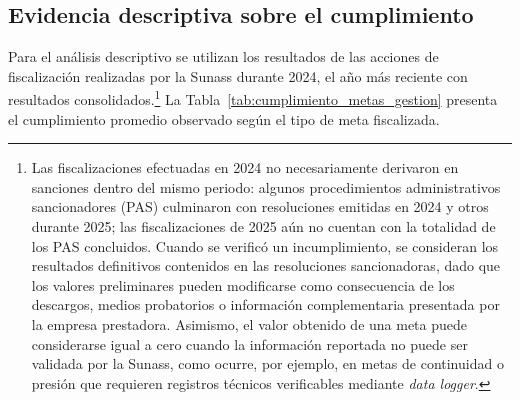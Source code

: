 \subsection{Evidencia descriptiva sobre el cumplimiento}

Para el análisis descriptivo se utilizan los resultados de las acciones de fiscalización realizadas por la Sunass durante 2024, el año más reciente con resultados consolidados.\footnote{Las fiscalizaciones efectuadas en 2024 no necesariamente derivaron en sanciones dentro del mismo periodo: algunos procedimientos administrativos sancionadores (PAS) culminaron con resoluciones emitidas en 2024 y otros durante 2025; las fiscalizaciones de 2025 aún no cuentan con la totalidad de los PAS concluidos. Cuando se verificó un incumplimiento, se consideran los resultados definitivos contenidos en las resoluciones sancionadoras, dado que los valores preliminares pueden modificarse como consecuencia de los descargos, medios probatorios o información complementaria presentada por la empresa prestadora. Asimismo, el valor obtenido de una meta puede considerarse igual a cero cuando la información reportada no puede ser validada por la Sunass, como ocurre, por ejemplo, en metas de continuidad o presión que requieren registros técnicos verificables mediante \textit{data logger}.} La Tabla~\ref{tab:cumplimiento_metas_gestion} presenta el cumplimiento promedio observado según el tipo de meta fiscalizada.

